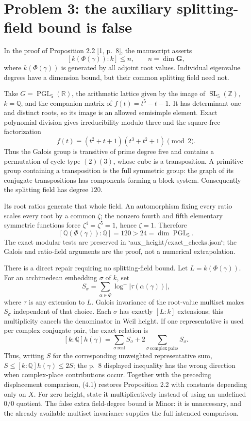 \documentclass[10pt]{article}
\begin{document}
\section*{Problem 3: the auxiliary splitting-field bound is false}
In the proof of Proposition 2.2 [1, p. 8], the manuscript asserts \[[k(\Phi(\gamma)):k]\le n,\qquad n=\dim\mathbf G,\] where \(k(\Phi(\gamma))\) is generated by all adjoint root values. Individual eigenvalue degrees have a dimension bound, but their common splitting field need not.\par
Take \(G=\operatorname{PGL}_5(\mathbb R)\), the arithmetic lattice given by the image of \(\operatorname{SL}_5(\mathbb Z)\), \(k=\mathbb Q\), and the companion matrix of \(f(t)=t^5-t-1\). It has determinant one and distinct roots, so its image is an allowed semisimple element. Exact polynomial division gives irreducibility modulo three and the square-free factorization \[f(t)\equiv(t^2+t+1)(t^3+t^2+1)\pmod2.\] Thus the Galois group is transitive of prime degree five and contains a permutation of cycle type \((2)(3)\), whose cube is a transposition. A primitive group containing a transposition is the full symmetric group: the graph of its conjugate transpositions has components forming a block system. Consequently the splitting field has degree \(120\).\par
Its root ratios generate that whole field. An automorphism fixing every ratio scales every root by a common \(\zeta\); the nonzero fourth and fifth elementary symmetric functions force \(\zeta^4=\zeta^5=1\), hence \(\zeta=1\). Therefore \[[\mathbb Q(\Phi(\gamma)):\mathbb Q]=120>24=\dim\operatorname{PGL}_5.\] The exact modular tests are preserved in `aux\_height/exact\_checks.json`; the Galois and ratio-field arguments are the proof, not a numerical extrapolation.\par
There is a direct repair requiring no splitting-field bound. Let \(L=k(\Phi(\gamma))\). For an archimedean embedding \(\sigma\) of \(k\), set \[S_\sigma=\sum_{\alpha\in\Phi}\log^+|\tau(\alpha(\gamma))|,\] where \(\tau\) is any extension to \(L\). Galois invariance of the root-value multiset makes \(S_\sigma\) independent of that choice. Each \(\sigma\) has exactly \([L:k]\) extensions; this multiplicity cancels the denominator in Weil height. If one representative is used per complex conjugate pair, the exact relation is \[[k:\mathbb Q]h(\gamma)=
 \sum_{\sigma\ \mathrm{real}}S_\sigma+
 2\sum_{\sigma\ \mathrm{complex\ pairs}}S_\sigma.
 \tag{4.1}\] Thus, writing \(S\) for the corresponding unweighted representative sum, \(S\le[k:\mathbb Q]h(\gamma)\le2S\); the p. 8 displayed inequality has the wrong direction when complex-place contributions occur. Together with the preceding displacement comparison, (4.1) restores Proposition 2.2 with constants depending only on \(X\). For zero height, state it multiplicatively instead of using an undefined \(0/0\) quotient. The false extra field-degree bound is Minor: it is unnecessary, and the already available multiset invariance supplies the full intended comparison.\par
\end{document}
